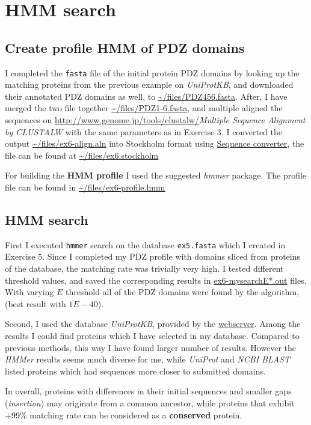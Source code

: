 \chapter{HMM search}
\section{Create profile HMM of PDZ domains}
I completed the \texttt{fasta} file of the initial protein PDZ domains by looking up the matching proteins from the previous example on \emph{UniProtKB},
 and downloaded their annotated PDZ domains as well, to \url{~/files/PDZ456.fasta}. After, I have merged the two file together  \url{~/files/PDZ1-6.fasta}, and multiple aligned the sequences on \url{http://www.genome.jp/tools/clustalw/}{\emph{Multiple Sequence Alignment by CLUSTALW}} with the same parameters as in Exercise 3. 
I converted the output \url{~/files/ex6-align.aln} into Stockholm format using \href{http://sequenceconversion.bugaco.com/converter/biology/sequences/index.html}{Sequence converter}, the file can be found at \url{~/files/ex6.stockholm}

For building the \textbf{HMM profile} I used the suggested \emph{hmmer} package.
The profile file can be found in \url{~/files/ex6-profile.hmm}

\section{HMM search}
First I executed \texttt{hmmer} search on the database \texttt{ex5.fasta} which I created in Exercise 5. Since I completed my PDZ profile with domains sliced from proteins of the database, the matching rate was trivially very high. 
I tested different threshold values, and saved the corresponding results in \url{ex6-mysearchE*.out} files.
With varying $E$ threshold all of the PDZ domains were found by the algorithm, (best result with $1E-40$).

Second, I used the database \emph{UniProtKB}, provided by the \href{https://www.ebi.ac.uk/Tools/hmmer/search/hmmsearch}{webserver}. Among the results I could find proteins which I have selected in my database. Compared to previous methods, this way I have found larger number of results. However the \emph{HMMer} results seems much diverse for me, while \emph{UniProt} and \emph{NCBI BLAST} listed proteins which had sequences more closer to submitted domains.

In overall, proteins with differences in their initial sequences and smaller gaps (\emph{insertion}) may originate from a common ancestor, while proteins that exhibit +99\% matching rate can be considered as a \textbf{conserved} protein.